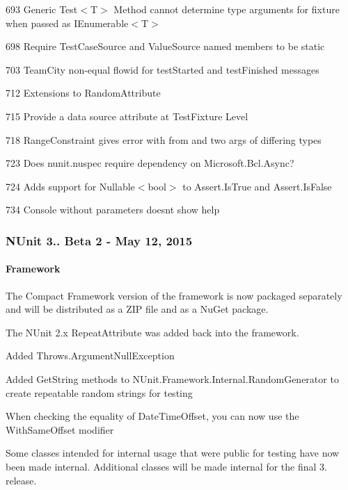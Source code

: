 \begin{DoxyItemize}
\item 693 Generic {\ttfamily Test$<$T$>$} Method cannot determine type arguments for fixture when passed as {\ttfamily I\+Enumerable$<$T$>$}
\item 698 Require Test\+Case\+Source and Value\+Source named members to be static
\item 703 Team\+City non-\/equal flowid for \textquotesingle{}test\+Started\textquotesingle{} and \textquotesingle{}test\+Finished\textquotesingle{} messages
\item 712 Extensions to Random\+Attribute
\item 715 Provide a data source attribute at Test\+Fixture Level
\item 718 Range\+Constraint gives error with from and two args of differing types
\item 723 Does nunit.\+nuspec require dependency on Microsoft.\+Bcl.\+Async?
\item 724 Adds support for {\ttfamily Nullable$<$bool$>$} to Assert.\+Is\+True and Assert.\+Is\+False
\item 734 Console without parameters doesn\textquotesingle{}t show help
\end{DoxyItemize}

\subsubsection*{N\+Unit 3.. Beta 2 -\/ May 12, 2015}

\paragraph*{Framework}


\begin{DoxyItemize}
\item The Compact Framework version of the framework is now packaged separately and will be distributed as a Z\+IP file and as a Nu\+Get package.
\item The N\+Unit 2.\+x Repeat\+Attribute was added back into the framework.
\item Added Throws.\+Argument\+Null\+Exception
\item Added Get\+String methods to N\+Unit.\+Framework.\+Internal.\+Random\+Generator to create repeatable random strings for testing
\item When checking the equality of Date\+Time\+Offset, you can now use the With\+Same\+Offset modifier
\item Some classes intended for internal usage that were public for testing have now been made internal. Additional classes will be made internal for the final 3. release.
\end{DoxyItemize}

